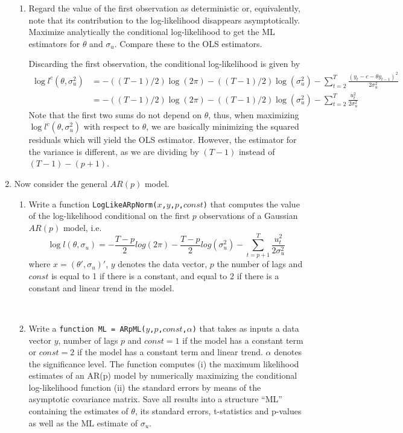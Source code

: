\documentclass[a4paper]{scrartcl}
\begin{document}
\begin{enumerate}
\begin{enumerate}
		\item Regard the value of the first observation as deterministic or, equivalently, note that its contribution to the log-likelihood disappears asymptotically. Maximize analytically the conditional log-likelihood to get the ML estimators for $\theta$ and $\sigma_u$. Compare these to the OLS estimators.
		\begin{solution}
		Discarding the first observation, the conditional log-likelihood is given by
		\begin{align*}
		\log l^c(\theta,\sigma_u^2)&= -((T-1)/2)\log(2\pi)-((T-1)/2)\log(\sigma^2_u)-\sum_{t=2}^{T}\frac{(y_t-c-\theta y_{t-1})^2}{2\sigma_u^2}\\
		&= -((T-1)/2)\log(2\pi)-((T-1)/2)\log(\sigma^2_u)-\sum_{t=2}^{T}\frac{u_t^2}{2\sigma_u^2}
		\end{align*}
		Note that the first two sums do not depend on $\theta$, thus, when maximizing $\log l^c(\theta,\sigma_u^2)$ with respect to $\theta$, we are basically minimizing the squared residuals which will yield the OLS estimator. However, the estimator for the variance is different, as we are dividing by $(T-1)$ instead of $(T-1)-(p+1)$.
		\end{solution}
	\end{enumerate}
	\item Now consider the general $AR(p)$ model.
	\begin{enumerate}
		\item Write a function \texttt{LogLikeARpNorm($x$,$y$,$p$,$const$)} that computes the value of the log-likelihood conditional on the first $p$ observations of a Gaussian $AR(p)$ model, i.e. 
		$$ \log l(\theta,\sigma_u)= -\frac{T-p}{2}log(2\pi)-\frac{T-p}{2}log(\sigma_u^2)-\sum_{t=p+1}^{T}\frac{u_t^2}{2\sigma_u^2}$$
		where $x=(\theta',\sigma_u)'$, $y$ denotes the data vector, $p$ the number of lags and $const$ is equal to 1 if there is a constant, and equal to 2 if there is a constant and linear trend in the model.
		\begin{solution}~
			
		\end{solution}
		\item Write a \texttt{function ML = ARpML($y$,$p$,$const$,$\alpha$)} that takes as inputs a data vector $y$, number of lags $p$ and $const=1$ if the model has a constant term or $const=2$ if the model has a constant term and linear trend. $\alpha$ denotes the significance level. The function computes (i) the maximum likelihood estimates of an AR(p) model by numerically maximizing the conditional log-likelihood function (ii) the standard errors by means of the asymptotic covariance matrix. Save all results into a structure \enquote{ML} containing the estimates of $\theta$, its standard errors, t-statistics and p-values as well as the ML estimate of $\sigma_u$.		

\end{enumerate}
\end{enumerate}
\end{document}
